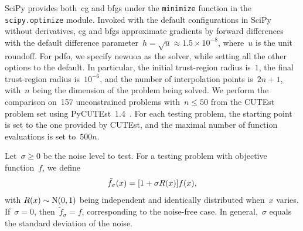 \documentclass[
    smallextended,  %
    final,          %
]{svjour3}
\newcommand{\NN}{\mathrm{N}}
\newcommand{\iter}[1][k]{x\ifthenelse{\equal{#1}{}}{}{_{#1}}}
\newcommand{\obj}{f}
\begin{document}
SciPy provides both~\gls{cg} and \gls{bfgs} under the \texttt{minimize} function in the \texttt{scipy.optimize} module.
Invoked with the default configurations in SciPy without derivatives,
\gls{cg} and \gls{bfgs} approximate gradients by forward differences with the default difference
parameter~$h = \sqrt{u} \approx 1.5\times 10^{-8}$, where~$u$ is the unit roundoff.
For \gls{pdfo}, we specify \gls{newuoa} as the solver, while setting all the other options to the default.
In particular, the initial trust-region radius is~$1$, the final trust-region radius is~$10^{-6}$,
and the number of interpolation points is~$2n + 1$, with~$n$ being the dimension of the problem
being solved.
We perform the comparison on~157 unconstrained problems with~$n \le 50$ from the
CUTEst~\cite{Gould_Orban_Toint_2015} problem set using PyCUTEst~1.4~\cite{Fowkes_Roberts_Burmen_2022}.
For each testing problem, the starting point is set to the one provided by CUTEst, and the maximal
number of function evaluations is set to~$500n$.




Let~$\sigma \ge 0$ be the noise level to test.
For a testing problem with objective function~$\obj$, we define
\begin{equation}
    \label{eq:noisy-obj}
    \tilde{\obj}_\sigma(\iter[]) = [1 + \sigma R(\iter[])] \obj(\iter[]),
\end{equation}
with $R(\iter[])\sim \NN(0, 1)$ being independent and identically distributed when~$x$ varies.
If~$\sigma = 0$, then~$\tilde{f}_\sigma = f$, corresponding to the noise-free case.
In general,~$\sigma$ equals the standard deviation of the noise.
\end{document}
